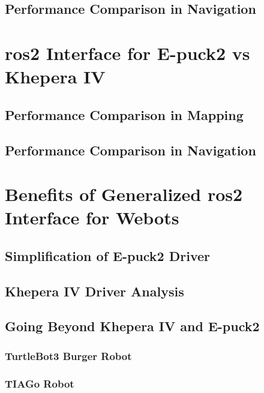 \subsection{Performance Comparison in Navigation}

\section{\ac{ros2} Interface for E-puck2 vs Khepera IV}
\subsection{Performance Comparison in Mapping}
\subsection{Performance Comparison in Navigation}

\section{Benefits of Generalized \ac{ros2} Interface for Webots}
\subsection{Simplification of E-puck2 Driver}
\subsection{Khepera IV Driver Analysis}
\subsection{Going Beyond Khepera IV and E-puck2}
\subsubsection{TurtleBot3 Burger Robot}
\subsubsection{TIAGo Robot}
